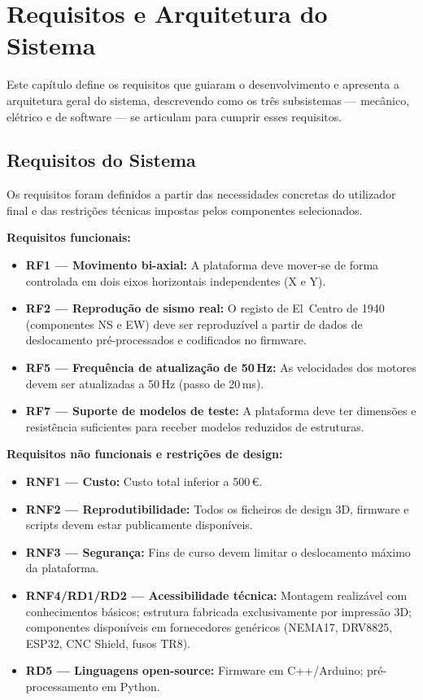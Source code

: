 

\chapter{Requisitos e Arquitetura do Sistema}
\label{chapter:architecture}

\begin{introduction}
Este capítulo define os requisitos que guiaram o desenvolvimento e apresenta a arquitetura geral do sistema, descrevendo como os três subsistemas --- mecânico, elétrico e de software --- se articulam para cumprir esses requisitos.
\end{introduction}

\section{Requisitos do Sistema}
\label{sec:requisitos}

Os requisitos foram definidos a partir das necessidades concretas do utilizador final e das restrições técnicas impostas pelos componentes selecionados.

\textbf{Requisitos funcionais:}
\begin{itemize}
    \item \textbf{RF1 --- Movimento bi-axial:} A plataforma deve mover-se de forma controlada em dois eixos horizontais independentes (X e Y).
    \item \textbf{RF2 --- Reprodução de sismo real:} O registo de El~Centro de 1940 (componentes NS e EW) deve ser reproduzível a partir de dados de deslocamento pré-processados e codificados no firmware.
    \item \textbf{RF5 --- Frequência de atualização de 50\,Hz:} As velocidades dos motores devem ser atualizadas a 50\,Hz (passo de 20\,ms).
    \item \textbf{RF7 --- Suporte de modelos de teste:} A plataforma deve ter dimensões e resistência suficientes para receber modelos reduzidos de estruturas.
\end{itemize}

\textbf{Requisitos não funcionais e restrições de design:}
\begin{itemize}
    \item \textbf{RNF1 --- Custo:} Custo total inferior a 500\,\euro{}.
    \item \textbf{RNF2 --- Reprodutibilidade:} Todos os ficheiros de design 3D, firmware e scripts devem estar publicamente disponíveis.
    \item \textbf{RNF3 --- Segurança:} Fins de curso devem limitar o deslocamento máximo da plataforma.
    \item \textbf{RNF4/RD1/RD2 --- Acessibilidade técnica:} Montagem realizável com conhecimentos básicos; estrutura fabricada exclusivamente por impressão 3D; componentes disponíveis em fornecedores genéricos (NEMA17, DRV8825, ESP32, CNC Shield, fusos TR8).
    \item \textbf{RD5 --- Linguagens open-source:} Firmware em C++/Arduino; pré-processamento em Python.
\end{itemize}

